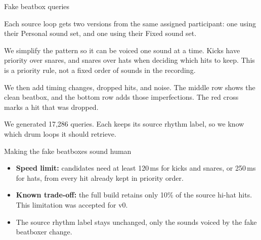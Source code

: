 \begin{frame}{Fake beatbox queries}
{    Each source loop gets two versions from the same assigned
    participant: one using their Personal sound set, and one
    using their Fixed sound set.

    We simplify the pattern so it can be voiced one sound
    at a time. Kicks have priority over snares, and snares
    over hats when deciding which hits to keep. This is a
    priority rule, not a fixed order of sounds in the recording.

    We then add timing changes, dropped hits, and noise.
    The middle row shows the clean beatbox, and the bottom
    row adds those imperfections. The red cross marks a
    hit that was dropped.

    We generated 17,286 queries. Each keeps its source rhythm
    label, so we know which drum loops it should retrieve.
  }
\end{frame}

\begin{frame}{Making the fake beatboxes sound human}


  \vspace{0.1cm}
  \small
  \begin{itemize}
    \item \textbf{Speed limit:} candidates need at least
      120\,ms for kicks and snares, or 250\,ms for hats,
      from every hit already kept in priority order.

    \item \textbf{Known trade-off:} the full build retains
      only 10\% of the source hi-hat hits.
      This limitation was accepted for v0.

    \item The source rhythm label stays unchanged,
      only the sounds voiced by the fake beatboxer change.
  \end{itemize}

\end{frame}
